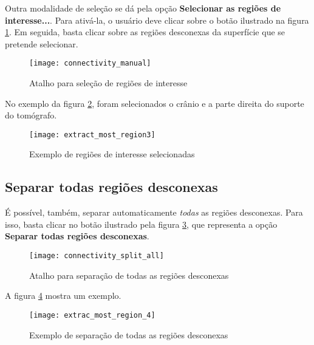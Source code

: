 Outra modalidade de seleção se dá pela opção \textbf{Selecionar as regiões de interesse...}.
Para ativá-la, o usuário deve clicar sobre o botão ilustrado na figura
\ref{fig:short_connectivity_manual}. Em seguida, basta clicar sobre as regiões desconexas
da superfície que se pretende selecionar.

\begin{figure}[!htb]
\centering
\texttt{[image: connectivity\_manual]}
\caption{Atalho para seleção de regiões de interesse}
\label{fig:short_connectivity_manual}
\end{figure}

No exemplo da figura \ref{fig:extract_most_region3}, foram selecionados o crânio e a parte
direita do suporte do tomógrafo.

\begin{figure}[!htb]
\centering
\texttt{[image: extract\_most\_region3]}
\caption{Exemplo de regiões de interesse selecionadas}
\label{fig:extract_most_region3}
\end{figure}


\subsection{Separar todas regiões desconexas}

É possível, também, separar automaticamente \textit{todas} as regiões desconexas. Para
isso, basta clicar no botão ilustrado pela figura \ref{fig:connectivity_split_all}, que
representa a opção \textbf{Separar todas regiões desconexas}.

\begin{figure}[!htb]
\centering
\texttt{[image: connectivity\_split\_all]}
\caption{Atalho para separação de todas as regiões desconexas}
\label{fig:connectivity_split_all}
\end{figure}

A figura \ref{fig:extrac_most_region_4} mostra um exemplo.

\begin{figure}[!htb]
\centering
\texttt{[image: extrac\_most\_region\_4]}
\caption{Exemplo de separação de todas as regiões desconexas}
\label{fig:extrac_most_region_4}
\end{figure}

